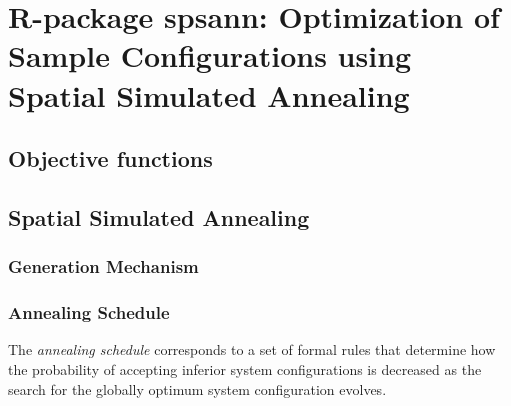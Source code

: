 \artigofalse
\chapter{R-package spsann: Optimization of Sample Configurations using Spatial Simulated Annealing}
\label{apen:spsann}

% 

\section{Objective functions}



\section{Spatial Simulated Annealing}

\subsection{Generation Mechanism}

\subsection{Annealing Schedule}

The \textit{annealing schedule} corresponds to a set of formal rules that 
determine how the probability of accepting inferior system configurations is 
decreased as the search for the globally optimum system configuration evolves.
